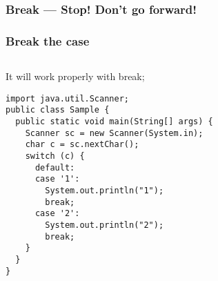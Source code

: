 \documentclass[en, 11pt, xcolor=dvipsnames]{beamer}
\begin{document}
\subsubsection{Break --- Stop! Don't go forward!}
\begin{frame}[fragile]
	\frametitle{Break the case}



	\begin{columns}[c]
		\begin{column}{0.98\textwidth}

			It will work properly with break;

			\begin{lstlisting}[style=Java]
import java.util.Scanner;
public class Sample {
  public static void main(String[] args) {
    Scanner sc = new Scanner(System.in);
    char c = sc.nextChar();
    switch (c) {
      default:
      case '1':
        System.out.println("1");
        break;
      case '2':
        System.out.println("2");
        break;
    }
  }
}
\end{lstlisting}

		\end{column}
	\end{columns}
\end{frame}
\end{document}
